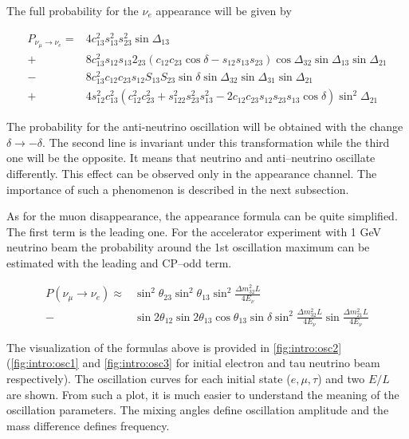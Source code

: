 \documentclass[../main.tex]{subfiles}
\begin{document}
The full probability for the $\nu_e$ appearance will be given by

\begin{equation}
\begin{split}
P_{\nu_\mu\to\nu_e}= &4c_{13}^2s_{13}^2s_{23}^2\sin\Delta_{13} \\
+&8c_{13}^2s_{12}s_{13}2_{23}\left(c_{12}c_{23}\cos\delta-s_{12}s_{13}s_{23}\right)\cos\Delta_{32}\sin\Delta_{13}\sin\Delta_{21} \\
-&8c_{13}^2c_{12}c_{23}s_{12}S_{13}S_{23}\sin\delta\sin\Delta_{32}\sin\Delta_{31}\sin\Delta_{21} \\
+&4s_{12}^2c_{13}^2\left(c_{12}^2c^2_{23}+s^2_{122}s^2_{23}s^2_{13}-2c_{12}c_{23}s_{12}s_{23}s_{13}\cos\delta\right)\sin^2\Delta_{21}
\end{split}
\label{eq:intro:app_p}
\end{equation}

The probability for the anti-neutrino oscillation will be obtained with the change $\delta\to-\delta$. The second line is invariant under this transformation while the third one will be the opposite. It means that neutrino and anti--neutrino oscillate differently. This effect can be observed only in the appearance channel. The importance of such a phenomenon is described in the next subsection.

As for the muon disappearance, the appearance formula can be quite simplified. The first term is the leading one. For the accelerator experiment with 1 GeV neutrino beam the probability around the 1st oscillation maximum can be estimated with the leading and CP--odd term.

\begin{align}
\label{eq:intro:nue_simple}
P\left(\nu_\mu\to\nu_e\right)\approx&\sin^2\theta_{23}\sin^2\theta_{13}\sin^2\frac{\Delta m_{32}^2L}{4E_\nu} \\
-&\sin2\theta_{12}\sin2\theta_{13}\cos\theta_{13}\sin\delta\sin^2\frac{\Delta m_{32}^2L}{4E_\nu}\sin\frac{\Delta m_{21}^2L}{4E_\nu}
\end{align}

The visualization of the formulas above is provided in \autoref{fig:intro:osc2} (\autoref{fig:intro:osc1} and \autoref{fig:intro:osc3} for initial electron and tau neutrino beam respectively). The oscillation curves for each initial state ($e, \mu, \tau$) and two $E/L$ are shown. From such a plot, it is much easier to understand the meaning of the oscillation parameters. The mixing angles define oscillation amplitude and the mass difference defines frequency.
\end{document}
